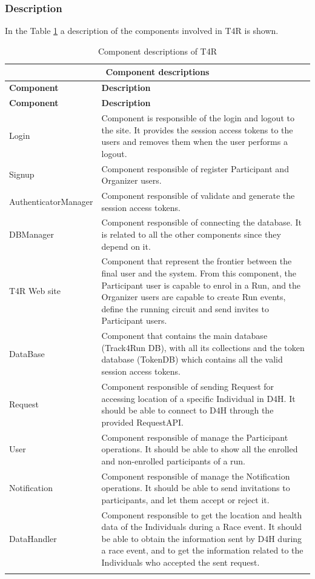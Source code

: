 \documentclass[a4paper, hidelinks, 12pt]{report}
\begin{document}
			\subsubsection{Description}
			In the Table \ref{table:t4r_component_descriptions} a description of the components involved in T4R is shown.
			
		\begin{longtable}{l p{}}
			\hline\hline
			\multicolumn{2}{c}{\textbf{Component descriptions}} \\
			\hline
			\textbf{Component} & \textbf{Description} \\ [0.5ex]
			\hline
			\endfirsthead
			\hline
			\textbf{Component} & \textbf{Description} \\ [0.5ex]
			\hline
			\endhead
			Login & Component is responsible of the login and logout to the site. It provides the session access tokens to the users and removes them when the user performs a logout. \\
			Signup & Component responsible of register Participant and Organizer users. \\
			AuthenticatorManager & Component responsible of validate and generate the session access tokens.\\
			DBManager & Component responsible of connecting the database. It is related to all the other components since they depend on it.\\
			T4R Web site & Component that represent the frontier between the final user and the system. From this component, the Participant user is capable to enrol in a Run, and the Organizer users are capable to create Run events, define the running circuit and send invites to Participant users.\\
			DataBase & Component that contains the main database (Track4Run DB), with all its collections and the token database (TokenDB) which contains all the valid session access tokens.\\
			Request & Component responsible of sending Request for accessing location of a specific Individual in D4H. It should be able to connect to D4H through the provided RequestAPI.\\
			User & Component responsible of manage the Participant operations. It should be able to show all the enrolled and non-enrolled participants of a run.\\
			Notification & Component responsible of manage the Notification operations. It should be able to send invitations to participants, and let them accept or reject it. \\
			DataHandler & Component responsible to get the location and health data of the Individuals during a Race event. It should be able to obtain the information sent by D4H during a race event, and to get the information related to the Individuals who accepted the sent request.\\
			
			\hline
			\caption{Component descriptions of T4R}
			\label{table:t4r_component_descriptions}
		\end{longtable}
			
\end{document}
